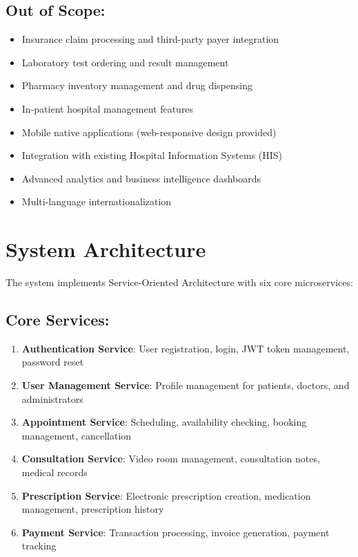 \documentclass[11pt,a4paper]{article}
\begin{document}
\subsection*{Out of Scope:}
\begin{itemize}[leftmargin=*, itemsep=0.1em]
    \item Insurance claim processing and third-party payer integration
    \item Laboratory test ordering and result management
    \item Pharmacy inventory management and drug dispensing
    \item In-patient hospital management features
    \item Mobile native applications (web-responsive design provided)
    \item Integration with existing Hospital Information Systems (HIS)
    \item Advanced analytics and business intelligence dashboards
    \item Multi-language internationalization
\end{itemize}

\section{System Architecture}

The system implements Service-Oriented Architecture with six core microservices:

\subsection*{Core Services:}
\begin{enumerate}[leftmargin=*, itemsep=0.2em]
    \item \textbf{Authentication Service}: User registration, login, JWT token management, password reset
    \item \textbf{User Management Service}: Profile management for patients, doctors, and administrators
    \item \textbf{Appointment Service}: Scheduling, availability checking, booking management, cancellation
    \item \textbf{Consultation Service}: Video room management, consultation notes, medical records
    \item \textbf{Prescription Service}: Electronic prescription creation, medication management, prescription history
    \item \textbf{Payment Service}: Transaction processing, invoice generation, payment tracking
\end{enumerate}
\end{document}
